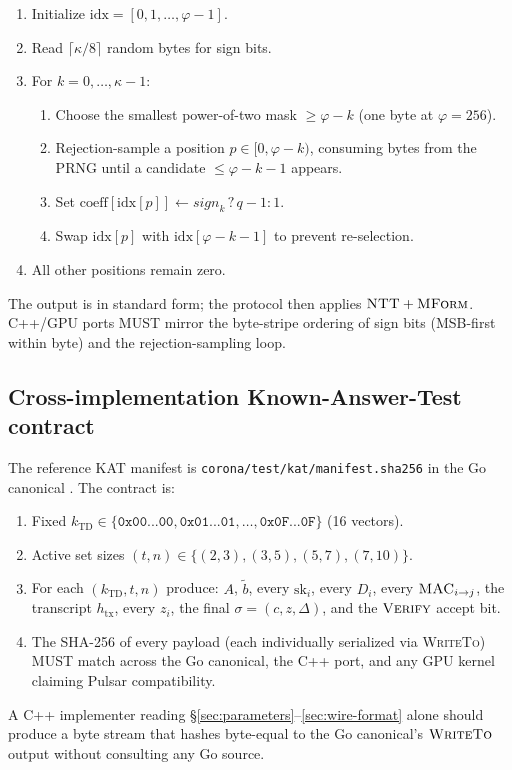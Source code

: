 \begin{enumerate}
\item Initialize $\mathrm{idx} = [0, 1, \ldots, \varphi-1]$.
\item Read $\lceil \kappa/8 \rceil$ random bytes for sign bits.
\item For $k = 0, \ldots, \kappa - 1$:
\begin{enumerate}
  \item Choose the smallest power-of-two mask $\ge \varphi - k$ (one byte at $\varphi = 256$).
  \item Rejection-sample a position $p \in [0, \varphi - k)$, consuming bytes from the PRNG until a candidate $\le \varphi - k - 1$ appears.
  \item Set $\mathrm{coeff}[\mathrm{idx}[p]] \leftarrow \mathit{sign}_k \,?\, q-1 : 1$.
  \item Swap $\mathrm{idx}[p]$ with $\mathrm{idx}[\varphi - k - 1]$ to prevent re-selection.
\end{enumerate}
\item All other positions remain zero.
\end{enumerate}

The output is in standard form; the protocol then applies $\textsc{NTT} + \textsc{MForm}$. C++/GPU ports MUST mirror the byte-stripe ordering of sign bits (MSB-first within byte) and the rejection-sampling loop.

\subsection{Cross-implementation Known-Answer-Test contract}

The reference KAT manifest is \texttt{corona/test/kat/manifest.sha256} in the Go canonical \cite{corona}. The contract is:

\begin{enumerate}
\item Fixed $k_{\mathrm{TD}} \in \{\texttt{0x00...00}, \texttt{0x01...01}, \ldots, \texttt{0x0F...0F}\}$ (16 vectors).
\item Active set sizes $(t, n) \in \{(2,3), (3,5), (5,7), (7,10)\}$.
\item For each $(k_{\mathrm{TD}}, t, n)$ produce: $A$, $\tilde b$, every $\mathrm{sk}_i$, every $D_i$, every $\textsc{MAC}_{i \to j}$, the transcript $h_{\mathrm{tx}}$, every $z_i$, the final $\sigma = (c, z, \Delta)$, and the $\textsc{Verify}$ accept bit.
\item The SHA-256 of every payload (each individually serialized via \textsc{WriteTo}) MUST match across the Go canonical, the C++ port, and any GPU kernel claiming Pulsar compatibility.
\end{enumerate}

A C++ implementer reading \S\ref{sec:parameters}--\ref{sec:wire-format} alone should produce a byte stream that hashes byte-equal to the Go canonical's $\textsc{WriteTo}$ output without consulting any Go source.
